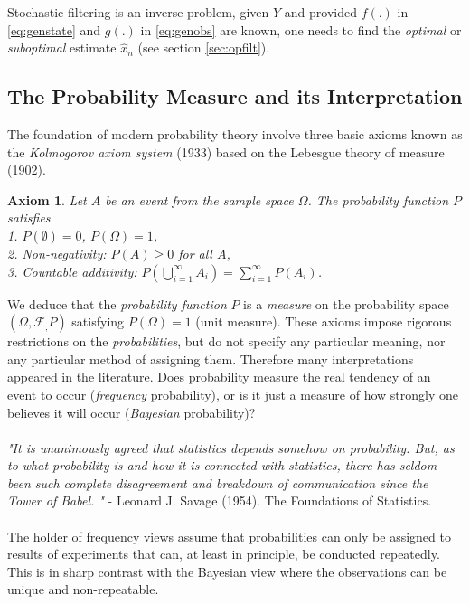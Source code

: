 \documentclass{article}
\newtheorem{axiom}{Axiom}
\theoremstyle{definition}
\theoremstyle{remark}
\newcommand{\filtration}[1]{\ensuremath{\mathscr{F}_{#1}}}
\begin{document}
Stochastic filtering is an inverse problem, given $Y$ and provided $f(.)$ in \eqref{eq:genstate} and $g(.)$ in \eqref{eq:genobs} are known, one needs to find the \emph{optimal} or \emph{suboptimal} estimate $\hat{x}_n$ (see section \ref{sec:opfilt}).








\subsection{The Probability Measure and its Interpretation}
The foundation of modern probability theory involve three basic axioms known as the \textit{Kolmogorov axiom system} (1933) based on the Lebesgue theory of measure (1902). 
\begin{axiom} Let $A$ be an event from the sample space $\Omega$. The probability function $P$ satisfies \\
1. $P(\emptyset)=0$, $P(\Omega)=1$,\\
2. Non-negativity: $P(A)\geq 0$ for all $A$,\\
3. Countable additivity: $P\left( \bigcup_{i=1}^{\infty} A_i\right) = \sum_{i=1}^\infty P(A_i)$.
\end{axiom}
We deduce that the \emph{probability function} $P$ is a \emph{measure} on the probability space $(\Omega,\filtration,P)$ satisfying $P(\Omega)=1$ (unit measure). These axioms impose rigorous restrictions on the \textit{probabilities}, but do not specify any particular meaning, nor any particular method of assigning them. Therefore many interpretations appeared in the literature. Does probability measure the real tendency of an event to occur (\emph{frequency} probability), or is it just a measure of how strongly one believes it will occur (\emph{Bayesian} probability)? \\
\\
\textit{"It is unanimously agreed that statistics depends somehow on probability. But, as to what probability is and how it is connected with statistics, there has seldom been such complete disagreement and breakdown of communication since the Tower of Babel. "} - Leonard J. Savage (1954). The Foundations of Statistics.\\
\\
The holder of frequency views assume that probabilities can only be assigned to results of experiments that can, at least in principle, be conducted repeatedly. This is in sharp contrast with the Bayesian view where the observations can be unique and non-repeatable.\\
\end{document}
